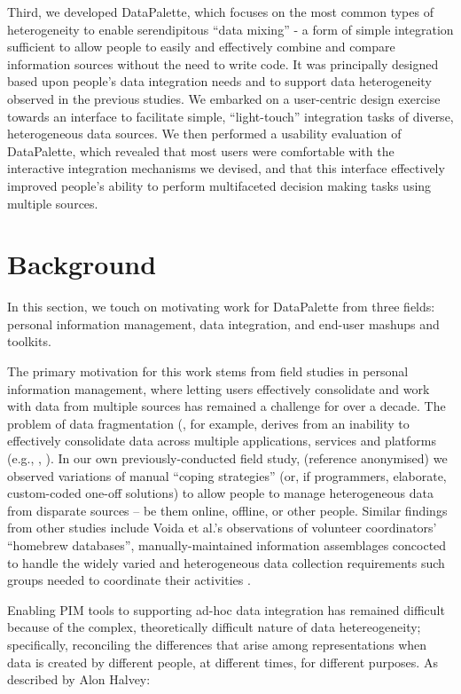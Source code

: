 \documentclass{sigchi}
\begin{document}
Third, we developed DataPalette, which focuses on the most common types of heterogeneity to enable serendipitous ``data mixing'' - a form of simple integration sufficient to allow people to easily and effectively combine and compare information sources without the need to write code.  It was principally designed based upon people's data integration needs and to support data heterogeneity observed in the previous studies.  We embarked on a user-centric design exercise towards an interface to facilitate simple, ``light-touch'' integration tasks of diverse, heterogeneous data sources.  We then performed a usability evaluation of DataPalette, which revealed that most users were comfortable with the interactive integration mechanisms we devised, and that this interface effectively improved people's ability to perform multifaceted decision making tasks using multiple sources.

\section{Background}

In this section, we touch on motivating work for DataPalette from three fields: personal information management, data integration, and end-user mashups and toolkits.

The primary motivation for this work stems from field studies in personal information management, where letting users effectively consolidate and work with data from multiple sources has remained a challenge for over a decade. The problem of data fragmentation (\cite{Jones05towardsa}, for example, derives from an inability to effectively consolidate data across multiple applications, services and platforms (e.g., \cite{bergman}, \cite{boardmansasse}). In our own previously-conducted field study, (reference anonymised) we observed variations of manual ``coping strategies'' (or, if programmers, elaborate, custom-coded one-off solutions) to allow people to manage heterogeneous data from disparate sources -- be them online, offline, or other people.  Similar findings from other studies include Voida et al.'s observations of volunteer coordinators' ``homebrew databases'', manually-maintained information assemblages concocted to handle the widely varied and heterogeneous data collection requirements such groups needed to coordinate their activities \cite{Voida:2011:HDC:1978942.1979078}.

Enabling PIM tools to supporting ad-hoc data integration has remained difficult because of the complex, theoretically difficult nature of data hetereogeneity; specifically, reconciling the differences that arise among representations when data is created by different people, at different times, for different purposes. As described by Alon Halvey:
\end{document}
